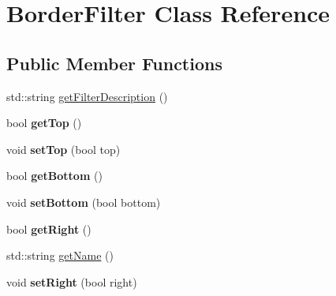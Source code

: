 \hypertarget{classModel_1_1Filter_1_1BorderFilter}{}\section{Border\+Filter Class Reference}
\label{classModel_1_1Filter_1_1BorderFilter}
\subsection*{Public Member Functions}
\begin{DoxyCompactItemize}
\item 
std\+::string \hyperlink{classModel_1_1Filter_1_1BorderFilter_a2b3f7d8fcd3d774b4a2fde5914a9729f}{get\+Filter\+Description} ()
\item 
\hypertarget{classModel_1_1Filter_1_1BorderFilter_a7f662ce666098754b0916a828633f842}{}bool {\bfseries get\+Top} ()\label{classModel_1_1Filter_1_1BorderFilter_a7f662ce666098754b0916a828633f842}

\item 
\hypertarget{classModel_1_1Filter_1_1BorderFilter_a41a3d0253d877ec681fc30f85ae21aed}{}void {\bfseries set\+Top} (bool top)\label{classModel_1_1Filter_1_1BorderFilter_a41a3d0253d877ec681fc30f85ae21aed}

\item 
\hypertarget{classModel_1_1Filter_1_1BorderFilter_ac96fcca335b0daaa5e216993666a7af2}{}bool {\bfseries get\+Bottom} ()\label{classModel_1_1Filter_1_1BorderFilter_ac96fcca335b0daaa5e216993666a7af2}

\item 
\hypertarget{classModel_1_1Filter_1_1BorderFilter_ae60a4cf24fcd4cc34ca831917a609e79}{}void {\bfseries set\+Bottom} (bool bottom)\label{classModel_1_1Filter_1_1BorderFilter_ae60a4cf24fcd4cc34ca831917a609e79}

\item 
\hypertarget{classModel_1_1Filter_1_1BorderFilter_a09836b29d544b94e145dd6a725887dd2}{}bool {\bfseries get\+Right} ()\label{classModel_1_1Filter_1_1BorderFilter_a09836b29d544b94e145dd6a725887dd2}

\item 
std\+::string \hyperlink{classModel_1_1Filter_1_1BorderFilter_ac0fc966d4386ddb71d99361e3fccb311}{get\+Name} ()
\item 
\hypertarget{classModel_1_1Filter_1_1BorderFilter_a18165f5951ddba8f3b25b2a199f90bc1}{}void {\bfseries set\+Right} (bool right)\label{classModel_1_1Filter_1_1BorderFilter_a18165f5951ddba8f3b25b2a199f90bc1}


\end{DoxyCompactItemize}
